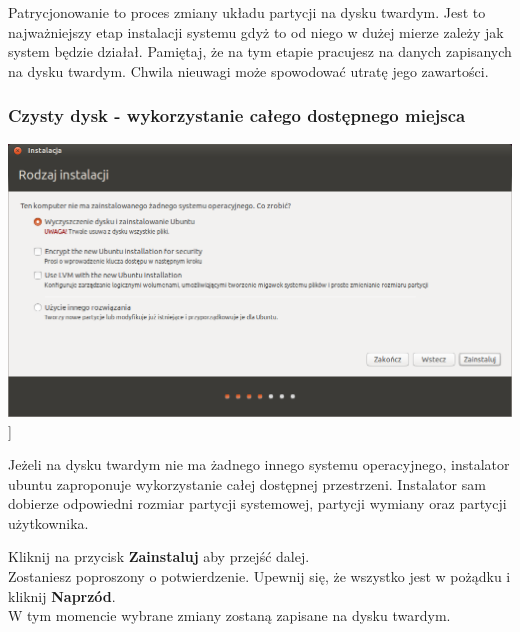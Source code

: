 \label{subsec:partycjonowanie}
Patrycjonowanie to proces zmiany układu partycji na dysku twardym. Jest to najważniejszy etap instalacji systemu gdyż to od niego w dużej mierze zależy jak system będzie działał. Pamiętaj, że na tym etapie pracujesz na danych zapisanych na dysku twardym. Chwila nieuwagi może spowodować utratę jego zawartości.

\subsubsection{Czysty dysk - wykorzystanie całego dostępnego miejsca}
\begin{center}
	\includegraphics[scale=0.5]{images/instalator_partycjonowanie_proste.png}]
\end{center}

Jeżeli na dysku twardym nie ma żadnego innego systemu operacyjnego, instalator ubuntu zaproponuje wykorzystanie całej dostępnej przestrzeni. Instalator sam dobierze odpowiedni rozmiar partycji systemowej, partycji wymiany oraz partycji użytkownika.
\begin{flushright}
Kliknij na przycisk \textbf{Zainstaluj} aby przejść dalej.\\
Zostaniesz poproszony o potwierdzenie. Upewnij się, że wszystko jest w pożądku i kliknij \textbf{Naprzód}.\\
W tym momencie wybrane zmiany zostaną zapisane na dysku twardym.
\end{flushright}
\clearpage

